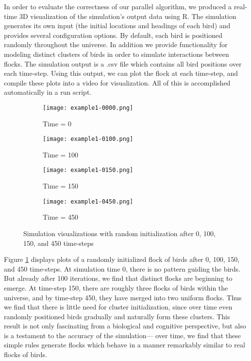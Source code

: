In order to evaluate the correctness of our parallel algorithm, we
produced a real-time 3D visualization of the simulation's output data
using R. The simulation generates its own input (the initial locations
and headings of each bird) and provides several configuration
options. By default, each bird is positioned randomly throughout the
universe. In addition we provide functionality for modeling distinct
clusters of birds in order to simulate interactions between flocks.
The simulation output is a .csv file which contains all bird positions
over each time-step. Using this output, we can plot the flock at each
time-step, and compile these plots into a video for visualization. All
of this is accomplished automatically in a run script.

\begin{figure}[h!]
  \centering
  \begin{subfigure}{0.24\textwidth}
    \centering
    \texttt{[image: example1-0000.png]}
    \caption{Time = 0}
  \end{subfigure}
  \begin{subfigure}{0.24\textwidth}
    \centering
    \texttt{[image: example1-0100.png]}
    \caption{Time = 100}
  \end{subfigure}
  \begin{subfigure}{0.24\textwidth}
    \centering
    \texttt{[image: example1-0150.png]}
    \caption{Time = 150}
  \end{subfigure}
  \begin{subfigure}{0.24\textwidth}
    \centering
    \texttt{[image: example1-0450.png]}
    \caption{Time = 450}
  \end{subfigure}
  
  \caption{Simulation visualizations with random initialization after
    0, 100, 150, and 450 time-steps}
  \label{fig:visuals}
\end{figure}

Figure \ref{fig:visuals} displays plots of a randomly initialized
flock of birds after 0, 100, 150, and 450 time-steps. At simulation
time 0, there is no pattern guiding the birds. But already after 100
iterations, we find that distinct flocks are beginning to emerge. At
time-step 150, there are roughly three flocks of birds within the
universe, and by time-step 450, they have merged into two uniform
flocks. Thus we find that there is little need for cluster
initialization, since over time even randomly positioned birds
gradually and naturally form these clusters. This result is not only
fascinating from a biological and cognitive perspective, but also is
a testament to the accuracy of the simulation--- over time, we find
that these simple rules generate flocks which behave in a manner
remarkably similar to real flocks of birds.

